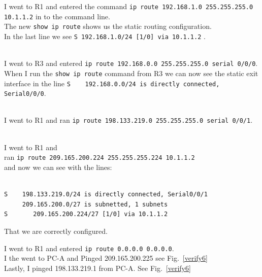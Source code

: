 \documentclass[../EngineeringJournal_CDavis.tex]{subfiles}
\begin{document}
\clearpage

I went to R1 and entered the command {\scriptsize{\verb$ip route 192.168.1.0 255.255.255.0 10.1.1.2$}\normalsize} in to the command line. 
\\The new {\scriptsize{\verb$show ip route$}\normalsize} shows us the static routing configuration. 
\\In the last line  we see {\scriptsize{\verb$S 192.168.1.0/24 [1/0] via 10.1.1.2$}\normalsize} .

\noindent{}
\\I went to R3 and entered {\scriptsize{\verb$ip route 192.168.0.0 255.255.255.0 serial 0/0/0$}\normalsize}.
\\When I run the {\scriptsize{\verb$show ip route$}\normalsize} command from R3 we can now see the static exit interface in the line {\scriptsize{\verb$S    192.168.0.0/24 is directly connected, Serial0/0/0$}\normalsize}.


\noindent{}
\\I went to R1 and ran {\scriptsize{\verb$ip route 198.133.219.0 255.255.255.0 serial 0/0/1$}\normalsize}.


\noindent{}
\\I went to R1 and 
\\ran {\scriptsize{\verb$ip route 209.165.200.224 255.255.255.224 10.1.1.2$}\normalsize} 
\\and now we can see with the lines: 
\begin{mdframed}
\scriptsize
\begin{verbatim}

S    198.133.219.0/24 is directly connected, Serial0/0/1
     209.165.200.0/27 is subnetted, 1 subnets
S       209.165.200.224/27 [1/0] via 10.1.1.2
\end{verbatim}
\normalsize
\end{mdframed}


That we are correctly configured.

\clearpage

I went to R1 and entered {\scriptsize{\verb$ip route 0.0.0.0 0.0.0.0$}\normalsize}.
\\I the went to PC-A and Pinged 209.165.200.225 see
Fig.~\ref{verify6}
\\Lastly, I pinged 198.133.219.1 from PC-A. See Fig.~\ref{verify6}
\end{document}
